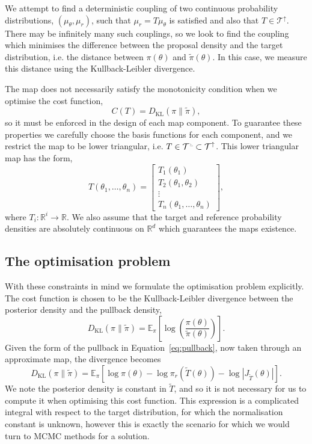 \documentclass[final]{siamltex}
\newcommand{\ltri}{%
\,\resizebox{!}{0.25\baselineskip}{%
\begin{tikzpicture}%
\draw[line width=1mm](0,0) -- (0,2) -- (2,0)  -- (0,0);
\end{tikzpicture}%
}\xspace%
}%
\begin{document}
We attempt to find a deterministic coupling of two continuous probability distributions, $(\mu_\theta, \mu_r)$, such that $\mu_r = T\mu_\theta$ is satisfied and also that $T \in \mathcal{T}^\uparrow$. There may be infinitely many such couplings, so we look to find the coupling which minimises the difference between the proposal density and the target distribution, i.e. the distance between $\pi(\theta)$ and $\tilde{\pi}(\theta)$. In this case, we measure this distance using the Kullback-Leibler divergence.

The map does not necessarily satisfy the monotonicity condition when we optimise the cost function,
\[
	C(T) = D_\text{KL}(\pi\|\tilde{\pi}),
\]
so it must be enforced in the design of each map component. To guarantee these properties we carefully choose the basis functions for each component, and we restrict the map to be lower triangular, i.e. $T \in \mathcal{T}^{\ltri}\subset\mathcal{T}^\uparrow$. This lower triangular map has the form,
\[
	T(\theta_1, \dots, \theta_n) = \begin{bmatrix} T_1(\theta_1) \\ T_2(\theta_1, \theta_2) \\ \vdots \\
		T_n(\theta_1, \dots, \theta_n) \end{bmatrix},
\]
where $T_i\colon \mathbb{R}^i \to \mathbb{R}$. We also assume that the target and reference probability densities are absolutely continuous on
$\mathbb{R}^d$ which guarantees the maps existence.

\subsection{The optimisation problem}

With these constraints in mind we formulate the optimisation problem explicitly. The cost function
is chosen to be the Kullback-Leibler divergence between the posterior density and the pullback density,
\[
	D_\text{KL}(\pi\|\tilde{\pi}) =
		\mathbb{E}_\pi\left[\log\left(\frac{\pi(\theta)}{\tilde{\pi}(\theta)}\right)\right].
\]
Given the form of the pullback in Equation~\eqref{eq:pullback}, now taken through an approximate map, the divergence becomes
\[
	D_\text{KL}(\pi\|\tilde{\pi}) = \mathbb{E}_\pi\left[\log\pi(\theta) - \log\pi_r(\tilde{T}(\theta)) -
		\log\left|J_{\tilde{T}}(\theta)\right|\right].
\]
We note the posterior density is constant in $\tilde{T}$, and so it is not necessary for us to compute it when optimising this cost function. This expression is a complicated integral with respect to the target distribution, for which the normalisation constant is unknown, however this is exactly the scenario for which we would turn to MCMC methods for a solution.
\end{document}
